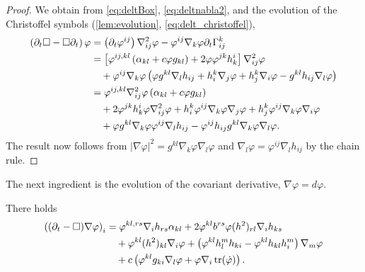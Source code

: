 \documentclass{amsart}
\begin{document}
\begin{proof}
We obtain from \cref{eq:deltBox}, \cref{eq:deltnabla2}, and the evolution of the Christoffel symbols (\cref{lem:evolution}, \cref{eq:delt_christoffel}),
\[
\begin{split}
\left(\partial_{t}\Box - \Box\partial_{t}\right) \varphi &= \left(\partial_{t}\varphi^{ij}\right) \nabla^2_{ij} \varphi - \varphi^{ij}\nabla_k \varphi\partial_t \Gamma^{k}_{ij} \\
&= \left[\varphi^{ij,kl} \left(\alpha_{kl} + c \varphi g_{kl}\right) + 2\varphi\varphi^{jk}h^{i}_{k}\right] \nabla^2_{ij} \varphi \\
&\quad + \varphi^{ij} \nabla_k \varphi \left(\varphi g^{kl} \nabla_l h_{ij} + h^k_i \nabla_j \varphi + h^k_j \nabla_i \varphi - g^{kl} h_{ij} \nabla_l \varphi\right) \\
&= \varphi^{ij,kl} \nabla^2_{ij} \varphi \left(\alpha_{kl} + c \varphi g_{kl}\right) \\
&\quad + 2\varphi^{jk}h^{i}_{k}\varphi \nabla^2_{ij} \varphi + h^k_i \varphi^{ij} \nabla_k \varphi \nabla_j \varphi + h^k_j \varphi^{ij} \nabla_k \varphi \nabla_i \varphi \\
&\quad + \varphi g^{kl}\nabla_k \varphi \varphi^{ij} \nabla_l h_{ij} - \varphi^{ij} h_{ij} g^{kl}\nabla_k \varphi \nabla_l \varphi.
\end{split}
\]
The result now follows from \(|\nabla \varphi|^2 = g^{kl}\nabla_k \varphi \nabla_l \varphi\) and \(\nabla_l \varphi = \varphi^{ij} \nabla_l h_{ij}\) by the chain rule.
\end{proof}

The next ingredient is the evolution of the covariant derivative, \(\nabla \varphi = d\varphi\).

\begin{lemma}
\label{lem:Evgradphi}
There holds
\[
\begin{split}
\left((\partial_{t}-\Box)\nabla\varphi\right)_{i} &= \varphi^{kl,rs}\nabla_i h_{rs} \alpha_{kl} + 2 \varphi^{kl} b^{rs} \varphi(h^2)_{rl} \nabla_i h_{ks} \\
&\quad + \varphi^{kl}(h^2)_{kl}\nabla_i \varphi + \left(\varphi^{kl}h^{m}_{l}h_{ki} - \varphi^{kl}h_{kl}h^{m}_{i}\right) \nabla_m \varphi\\
&\quad + c\left(\varphi^{kl}g_{ki} \nabla_l \varphi + \varphi \nabla_i \operatorname{tr}(\dot{\varphi})\right).
\end{split}
\]
\end{lemma}
\end{document}

